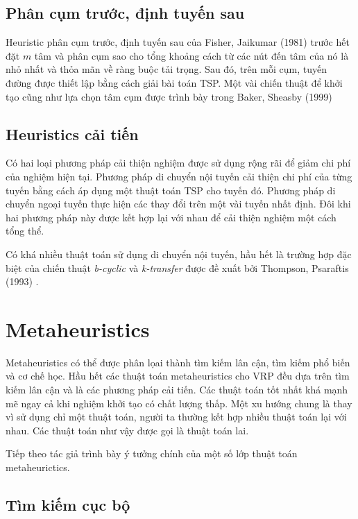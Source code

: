 \subsection{Phân cụm trước, định tuyến sau}

Heuristic phân cụm trước, định tuyến sau của Fisher, Jaikumar (1981) \cite{fisher1981generalized} trước hết đặt $m$ tâm và phân cụm sao cho tổng khoảng cách từ các nút đến tâm của nó là nhỏ nhất và thỏa mãn về ràng buộc tải trọng. Sau đó, trên mỗi cụm, tuyến đường được thiết lập bằng cách giải bài toán TSP. Một vài chiến thuật để khởi tạo cũng như lựa chọn tâm cụm được trình bày trong Baker, Sheasby (1999) \cite{baker1999extensions}

\subsection{Heuristics cải tiến}

Có hai loại phương pháp cải thiện nghiệm được sử dụng rộng rãi để giảm chi phí của nghiệm hiện tại. Phương pháp di chuyển nội tuyến cải thiện chi phí của từng tuyến bằng cách áp dụng một thuật toán TSP cho tuyến đó. Phương pháp di chuyển ngoại tuyến thực hiện các thay đổi trên một vài tuyến nhất định. Đôi khi hai phương pháp này được kết hợp lại với nhau để cải thiện nghiệm một cách tổng thể.

Có khá nhiều thuật toán sử dụng di chuyển nội tuyến, hầu hết là trường hợp đặc biệt của chiến thuật \textit{b-cyclic} và \textit{k-transfer} được đề xuất bởi Thompson, Psaraftis (1993) \cite{thompson1993cyclic}. 

\section{Metaheuristics}

Metaheuristics có thể được phân lọai thành tìm kiếm lân cận, tìm kiếm phổ biến và cơ chế học. Hầu hết các thuật toán metaheuristics cho VRP đều dựa trên tìm kiếm lân cận và là các phương pháp cải tiến. Các thuật toán tốt nhất khá mạnh mẽ ngay cả khi nghiệm khởi tạo có chất lượng thấp. Một xu hướng chung là thay vì sử dụng chỉ một thuật toán, người ta thường kết hợp nhiều thuật toán lại với nhau. Các thuật toán như vậy được gọi là thuật toán lai.

Tiếp theo tác giả trình bày ý tưởng chính của một số lớp thuật toán metaheurictics.

\subsection{Tìm kiếm cục bộ}

